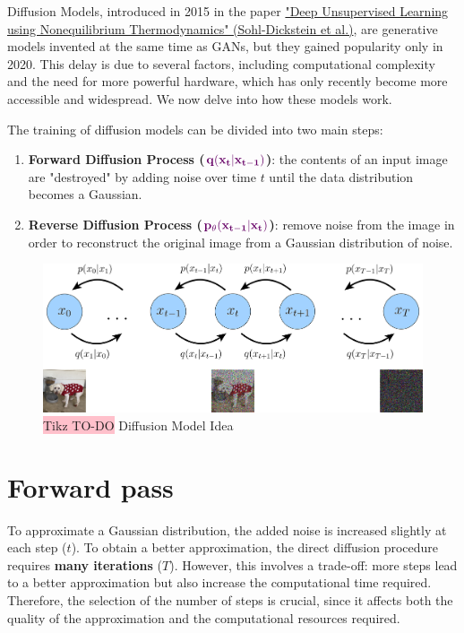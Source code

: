 Diffusion Models, introduced in 2015 in the paper \href{https://arxiv.org/pdf/1503.03585}{"Deep Unsupervised Learning using Nonequilibrium Thermodynamics" (Sohl-Dickstein et al.)}, are generative models invented at the same time as GANs, but they gained popularity only in 2020. This delay is due to several factors, including computational complexity and the need for more powerful hardware, which has only recently become more accessible and widespread. We now delve into how these models work.

The training of diffusion models can be divided into two main steps:

\begin{enumerate}
    \item \textbf{Forward Diffusion Process ($\mathbf{\textcolor{mypurple}{q(x_{t}|x_{t-1})}}$)}: the contents of an input image are "destroyed" by adding noise over time $t$ until the data distribution becomes a Gaussian.
    \item \textbf{Reverse Diffusion Process ($\mathbf{\textcolor{mypurple}{p_{\theta}(x_{t-1}|x_t)}}$)}: remove noise from the image in order to reconstruct the original image from a Gaussian distribution of noise.
\end{enumerate}

\begin{figure}[!htbp]
    \centering
    \includegraphics[width=\linewidth]{tikz/chapter10 - Diffusion Models Idea.png}
    \caption{{\color{red}\colorbox{pink}{Tikz TO-DO}} Diffusion Model Idea}
\end{figure}


\section{Forward pass}

To approximate a Gaussian distribution, the added noise is increased slightly at each step ($t$). To obtain a better approximation, the direct diffusion procedure requires \textbf{many iterations} ($T$). However, this involves a trade-off: more steps lead to a better approximation but also increase the computational time required. Therefore, the selection of the number of steps is crucial, since it affects both the quality of the approximation and the computational resources required.

